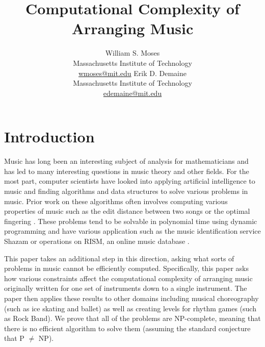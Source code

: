 \documentclass[11pt,letterpaper]{article}
\title{Computational Complexity of Arranging Music}
\author{
\minipage{0.49\textwidth}
\centering
{\Large William S. Moses}\\
Massachusetts Institute of Technology\\
\small{\href{mailto:wmoses@mit.edu}{wmoses@mit.edu}}
\endminipage
\hfill
\minipage{0.49\textwidth}
\centering
{\Large Erik D. Demaine}\\
Massachusetts Institute of Technology\\
\small{\href{mailto:edemaine@mit.edu}{edemaine@mit.edu}}
\endminipage
}
\date{}
\begin{document}
\maketitle


\section{Introduction}
Music has long been an interesting subject of analysis for mathematicians and has led to many interesting questions in music theory and other fields. For the most part, computer scientists have looked into applying artificial intelligence to music \cite{AI} and finding algorithms and data structures to solve various problems in music. Prior work on these algorithms often involves computing various properties of music such as the edit distance between two songs \cite{problems} or the optimal fingering \cite{dp}. These problems tend to be solvable in polynomial time using dynamic programming and have various application such as the music identification service Shazam \cite{shazam} or operations on RISM, an online music database \cite{rism}.

This paper takes an additional step in this direction, asking what sorts of problems in music cannot be efficiently computed. Specifically, this paper asks how various constraints affect the computational complexity of arranging music originally written for one set of instruments down to a single instrument. The paper then applies these results to other domains including musical choreography (such as ice skating and ballet) as well as creating levels for rhythm games (such as Rock Band). We prove that all of the problems are NP-complete, meaning that there is no efficient algorithm to solve them (assuming the standard conjecture that P $\neq$ NP).
\end{document}
